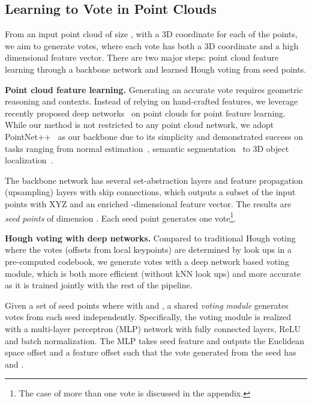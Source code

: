 \documentclass[10pt,twocolumn,letterpaper]{article}
\begin{document}
\subsection{Learning to Vote in Point Clouds}
\label{sec:votingnet:vote}


From an input point cloud of size , with a 3D coordinate for each of the  points, we aim to generate  votes, where each vote has both a 3D coordinate and a high dimensional feature vector. There are two major steps: point cloud feature learning through a backbone network and learned Hough voting from seed points.





\smallskip\noindent\textbf{Point cloud feature learning.}
Generating an accurate vote requires geometric reasoning and contexts. Instead of relying on hand-crafted features, we leverage recently proposed deep networks~\cite{qi2017pointnetplusplus,graham20183d,su2018splatnet,li2018pointcnn} on point clouds for point feature learning. While our method is not restricted to any point cloud network, we adopt PointNet++~\cite{qi2017pointnetplusplus} as our backbone due to its simplicity and demonstrated success on tasks ranging from normal estimation~\cite{guerrero2018pcpnet}, semantic segmentation~\cite{landrieu2018large} to 3D object localization~\cite{qi2018frustum}.

The backbone network has several set-abstraction layers and feature propagation (upsampling) layers with skip connections, which outputs a subset of the input points with XYZ and an enriched -dimensional feature vector. The results are  \emph{seed points} of dimension . Each seed point generates one vote\footnote{The case of more than one vote is discussed in the appendix.}.









\smallskip\noindent\textbf{Hough voting with deep networks.} Compared to traditional Hough voting where the votes (offsets from local keypoints) are determined by look ups in a pre-computed codebook, we generate votes with a deep network based voting module, which is both more efficient (without kNN look ups) and more accurate as it is trained jointly with the rest of the pipeline.

Given a set of seed points  where  with  and , a shared \emph{voting module} generates votes from each seed independently. Specifically, the voting module is realized with a multi-layer perceptron (MLP) network with fully connected layers, ReLU and batch normalization. The MLP takes seed feature  and outputs the Euclidean space offset  and a feature offset  such that the vote  generated from the seed  has  and .
\end{document}
